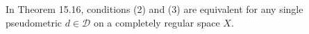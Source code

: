 In Theorem 15.16, conditions (2) and (3) are equivalent for any single pseudometric $d \in \mathcal{D}$ on a completely regular space $X$.
